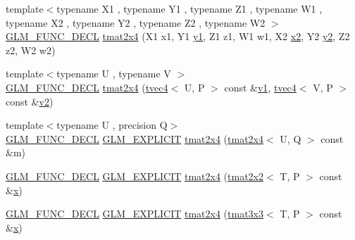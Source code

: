 \begin{DoxyCompactItemize}
\item 
{\footnotesize template$<$typename X1 , typename Y1 , typename Z1 , typename W1 , typename X2 , typename Y2 , typename Z2 , typename W2 $>$ }\\\mbox{\hyperlink{setup_8hpp_ab2d052de21a70539923e9bcbf6e83a51}{G\+L\+M\+\_\+\+F\+U\+N\+C\+\_\+\+D\+E\+CL}} \mbox{\hyperlink{structglm_1_1tmat2x4_ad2e63f3024aafac70e1c7dc97fa50b37}{tmat2x4}} (X1 x1, Y1 \mbox{\hyperlink{glad_8h_a48340161068d267815ac3131e9d03def}{y1}}, Z1 z1, W1 w1, X2 \mbox{\hyperlink{glad_8h_ad2cea6eadb01f017f0d57e7edf0ce988}{x2}}, Y2 \mbox{\hyperlink{glad_8h_af7158b5d27f7a6aa4ab9973fcc3a5c20}{y2}}, Z2 z2, W2 w2)
\item 
{\footnotesize template$<$typename U , typename V $>$ }\\\mbox{\hyperlink{setup_8hpp_ab2d052de21a70539923e9bcbf6e83a51}{G\+L\+M\+\_\+\+F\+U\+N\+C\+\_\+\+D\+E\+CL}} \mbox{\hyperlink{structglm_1_1tmat2x4_ab52cdbf9a2f1ae4b9b8d3e6ef8e84039}{tmat2x4}} (\mbox{\hyperlink{structglm_1_1tvec4}{tvec4}}$<$ U, P $>$ const \&\mbox{\hyperlink{glad_8h_a0779c3b73f9aa3a0ac5b0139b5d291d9}{v1}}, \mbox{\hyperlink{structglm_1_1tvec4}{tvec4}}$<$ V, P $>$ const \&\mbox{\hyperlink{glad_8h_a9a09a1837922b2b806f4589096a52049}{v2}})
\item 
{\footnotesize template$<$typename U , precision Q$>$ }\\\mbox{\hyperlink{setup_8hpp_ab2d052de21a70539923e9bcbf6e83a51}{G\+L\+M\+\_\+\+F\+U\+N\+C\+\_\+\+D\+E\+CL}} \mbox{\hyperlink{setup_8hpp_a6c74f5a5e7b134ab69023ff9a30d4d5d}{G\+L\+M\+\_\+\+E\+X\+P\+L\+I\+C\+IT}} \mbox{\hyperlink{structglm_1_1tmat2x4_a927ed33ecafc04dffbdc44b25e4b5466}{tmat2x4}} (\mbox{\hyperlink{structglm_1_1tmat2x4}{tmat2x4}}$<$ U, Q $>$ const \&m)
\item 
\mbox{\hyperlink{setup_8hpp_ab2d052de21a70539923e9bcbf6e83a51}{G\+L\+M\+\_\+\+F\+U\+N\+C\+\_\+\+D\+E\+CL}} \mbox{\hyperlink{setup_8hpp_a6c74f5a5e7b134ab69023ff9a30d4d5d}{G\+L\+M\+\_\+\+E\+X\+P\+L\+I\+C\+IT}} \mbox{\hyperlink{structglm_1_1tmat2x4_afc1dac325dc83720bcd251de94f5fdfc}{tmat2x4}} (\mbox{\hyperlink{structglm_1_1tmat2x2}{tmat2x2}}$<$ T, P $>$ const \&\mbox{\hyperlink{glad_8h_a92d0386e5c19fb81ea88c9f99644ab1d}{x}})
\item 
\mbox{\hyperlink{setup_8hpp_ab2d052de21a70539923e9bcbf6e83a51}{G\+L\+M\+\_\+\+F\+U\+N\+C\+\_\+\+D\+E\+CL}} \mbox{\hyperlink{setup_8hpp_a6c74f5a5e7b134ab69023ff9a30d4d5d}{G\+L\+M\+\_\+\+E\+X\+P\+L\+I\+C\+IT}} \mbox{\hyperlink{structglm_1_1tmat2x4_a315e700449248bbe7938b858a94e98ce}{tmat2x4}} (\mbox{\hyperlink{structglm_1_1tmat3x3}{tmat3x3}}$<$ T, P $>$ const \&\mbox{\hyperlink{glad_8h_a92d0386e5c19fb81ea88c9f99644ab1d}{x}})

\end{DoxyCompactItemize}
